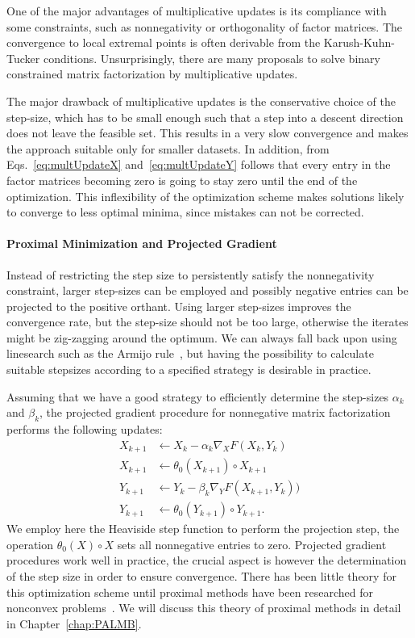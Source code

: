 One of the major advantages of multiplicative updates is its compliance with some constraints, such as nonnegativity or orthogonality of factor matrices. The  convergence to local extremal points is often derivable from the Karush-Kuhn-Tucker conditions. Unsurprisingly, there are many proposals to solve binary constrained matrix factorization by multiplicative updates.  

The major drawback of multiplicative updates is the conservative choice of the step-size, which has to be small enough such that a step into a descent direction does not leave the feasible set. This results in a very slow convergence and makes the approach suitable only for smaller datasets. In addition, from Eqs.~\eqref{eq:multUpdateX} and~\eqref{eq:multUpdateY} follows that every entry in the factor matrices becoming zero is going to stay zero until the end of the optimization. This inflexibility of the optimization scheme makes solutions likely to converge to less optimal minima, since mistakes can not be corrected. 
%
\paragraph{Proximal Minimization and Projected Gradient}
Instead of restricting the step size to persistently satisfy the nonnegativity constraint, larger step-sizes can be employed and possibly negative entries can be projected to the positive orthant. Using larger step-sizes improves the convergence rate, but the step-size should not be too large, otherwise the iterates might be zig-zagging around the optimum. We can always fall back upon using linesearch such as the Armijo rule~\citep{lin2007projected}, but having the possibility to calculate suitable stepsizes according to a specified strategy is desirable in practice.  

Assuming that we have a good strategy to efficiently determine the step-sizes $\alpha_k$ and $\beta_k$, the projected gradient procedure for nonnegative matrix factorization performs the following updates:
\begin{align*}
X_{k+1}&\gets X_k-\alpha_k\nabla_XF(X_k,Y_k) \\
X_{k+1}&\gets \theta_0(X_{k+1})\circ X_{k+1}\\
Y_{k+1}&\gets Y_k-\beta_k\nabla_YF(X_{k+1},Y_k))\\
Y_{k+1}&\gets \theta_0(Y_{k+1})\circ Y_{k+1}.
\end{align*}
We employ here the Heaviside step function to perform the projection step, the operation $\theta_0(X)\circ X$ sets all nonnegative entries to zero. Projected gradient procedures work well in practice, the crucial aspect is however the determination of the step size in order to ensure convergence. There has been little theory for this optimization scheme until proximal methods have been researched for nonconvex problems~\cite{bolte2014proximal}. We will discuss this theory of proximal methods in detail in Chapter~\ref{chap:PALMB}.

